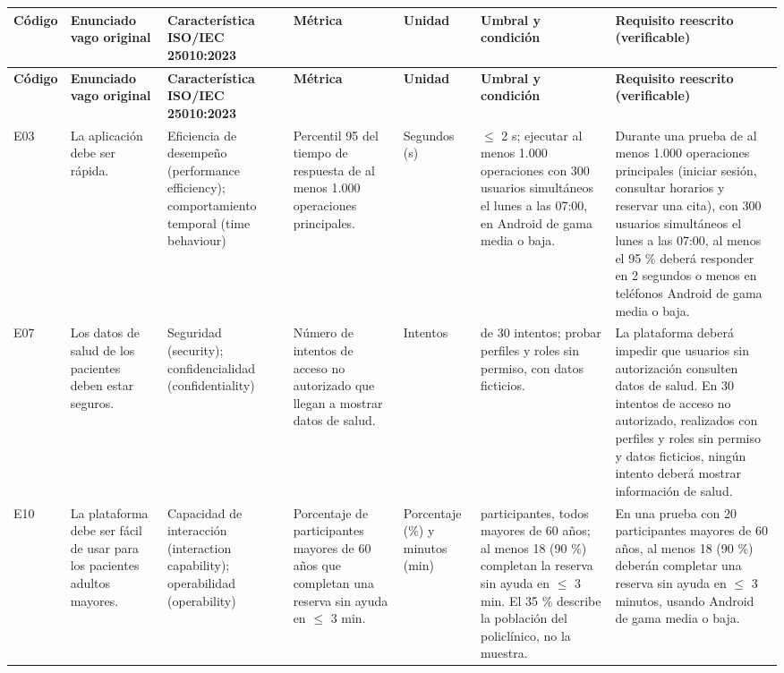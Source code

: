 \documentclass[10pt,letterpaper,landscape]{article}
\begin{document}
\begingroup\footnotesize\setlength{\tabcolsep}{3pt}\renewcommand{\arraystretch}{1.15}
\begin{longtable}{>{\raggedright\arraybackslash}p{1.25cm}>{\raggedright\arraybackslash}p{3cm}>{\raggedright\arraybackslash}p{3cm}>{\raggedright\arraybackslash}p{3.2cm}>{\raggedright\arraybackslash}p{1.8cm}>{\raggedright\arraybackslash}p{3.8cm}>{\raggedright\arraybackslash}p{6.0cm}}
\rowcolor{hdr}\textbf{Código} & \textbf{Enunciado vago original} & \textbf{Característica ISO/IEC 25010:2023} & \textbf{Métrica} & \textbf{Unidad} & \textbf{Umbral y condición} & \textbf{Requisito reescrito (verificable)} \\ \hline
\endfirsthead
\rowcolor{hdr}\textbf{Código} & \textbf{Enunciado vago original} & \textbf{Característica ISO/IEC 25010:2023} & \textbf{Métrica} & \textbf{Unidad} & \textbf{Umbral y condición} & \textbf{Requisito reescrito (verificable)} \\ \hline
\endhead
E03 & La aplicación debe ser rápida. & Eficiencia de desempeño (performance efficiency); comportamiento temporal (time behaviour) & Percentil 95 del tiempo de respuesta de al menos 1.000 operaciones principales. & Segundos (s) & $\leq$ 2 s; ejecutar al menos 1.000 operaciones con 300 usuarios simultáneos el lunes a las 07:00, en Android de gama media o baja. & Durante una prueba de al menos 1.000 operaciones principales (iniciar sesión, consultar horarios y reservar una cita), con 300 usuarios simultáneos el lunes a las 07:00, al menos el 95 \% deberá responder en 2 segundos o menos en teléfonos Android de gama media o baja. \\ \hline
E07 & Los datos de salud de los pacientes deben estar seguros. & Seguridad (security); confidencialidad (confidentiality) & Número de intentos de acceso no autorizado que llegan a mostrar datos de salud. & Intentos & 0 de 30 intentos; probar perfiles y roles sin permiso, con datos ficticios. & La plataforma deberá impedir que usuarios sin autorización consulten datos de salud. En 30 intentos de acceso no autorizado, realizados con perfiles y roles sin permiso y datos ficticios, ningún intento deberá mostrar información de salud. \\ \hline
E10 & La plataforma debe ser fácil de usar para los pacientes adultos mayores. & Capacidad de interacción (interaction capability); operabilidad (operability) & Porcentaje de participantes mayores de 60 años que completan una reserva sin ayuda en $\leq$ 3 min. & Porcentaje (\%) y minutos (min) & 20 participantes, todos mayores de 60 años; al menos 18 (90 \%) completan la reserva sin ayuda en $\leq$ 3 min. El 35 \% describe la población del policlínico, no la muestra. & En una prueba con 20 participantes mayores de 60 años, al menos 18 (90 \%) deberán completar una reserva sin ayuda en $\leq$ 3 minutos, usando Android de gama media o baja. \\ \hline

\end{longtable}
\end{document}
